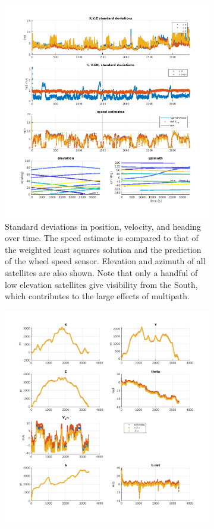 \documentclass[letterpaper,times]{IONconf}
\begin{document}
\begin{figure}
    \centering
    \begin{subfigure}{.47\textwidth}
        \centering
    \includegraphics[width=\textwidth]{std_devs}
    \caption{Standard deviations in position, velocity, and heading over time. The speed estimate is compared to that of  the weighted least squares solution and the prediction of the wheel speed sensor. Elevation and azimuth of all satellites are also shown. Note that only a handful of low elevation satellites give visibility from the South, which contributes to the  large effects of multipath.}
        \end{subfigure}
        \begin{subfigure}{.47\textwidth}
    \includegraphics[width=\textwidth]{3_sigs}

\end{subfigure}
\end{figure}
\end{document}
